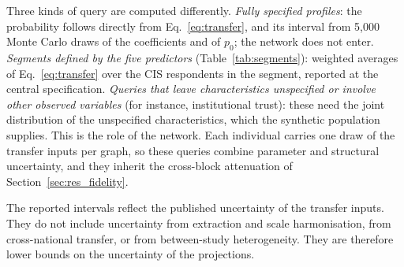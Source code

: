 Three kinds of query are computed differently. \emph{Fully specified
profiles}: the probability follows directly from Eq.~\eqref{eq:transfer}, and
its interval from 5{,}000 Monte Carlo draws of the coefficients and of $p_0$;
the network does not enter. \emph{Segments defined by the five predictors}
(Table~\ref{tab:segments}): weighted averages of Eq.~\eqref{eq:transfer} over
the CIS respondents in the segment, reported at the central specification.
\emph{Queries that leave characteristics unspecified or involve other observed
variables} (for instance, institutional trust): these need the joint
distribution of the unspecified characteristics, which the synthetic
population supplies. This is the role of the network. Each individual carries
one draw of the transfer inputs per graph, so these queries combine parameter
and structural uncertainty, and they inherit the cross-block attenuation of
Section~\ref{sec:res_fidelity}.

The reported intervals reflect the published uncertainty of the transfer
inputs. They do not include
uncertainty from extraction and scale harmonisation, from cross-national
transfer, or from between-study heterogeneity. They are therefore lower bounds
on the uncertainty of the projections.

